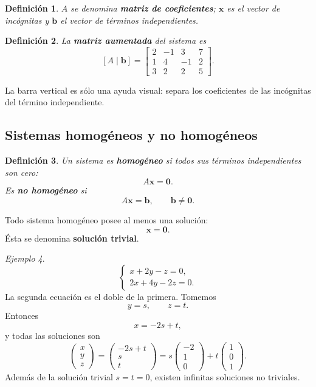 \documentclass[12pt]{article}
\newtheorem{definicion}{Definición}[section]
\theoremstyle{remark}
\newtheorem{ejemplo}[definicion]{Ejemplo}
\begin{document}
\begin{definicion}
$A$ se denomina \textbf{matriz de coeficientes}; $\mathbf{x}$ es el vector de incógnitas y
$\mathbf{b}$ el vector de términos independientes.
\end{definicion}

\begin{definicion}
La \textbf{matriz aumentada} del sistema es
\[
[A\mid\mathbf b]=
\left[
\begin{array}{ccc|c}
2&-1&3&7\\
1&4&-1&2\\
3&2&2&5
\end{array}
\right].
\]
\end{definicion}

La barra vertical es sólo una ayuda visual: separa los coeficientes de las incógnitas del término
independiente.
\subsection*{Sistemas homogéneos y no homogéneos}
\begin{definicion}
Un sistema es \textbf{homogéneo} si todos sus términos independientes son cero:
\[
A\mathbf{x}=\mathbf{0}.
\]
Es \textbf{no homogéneo} si
\[
A\mathbf{x}=\mathbf{b},\qquad \mathbf b\neq\mathbf0.
\]
\end{definicion}

Todo sistema homogéneo posee al menos una solución:
\[
\mathbf{x}=\mathbf0.
\]
Ésta se denomina \textbf{solución trivial}.

\begin{ejemplo}
\[
\begin{cases}
x+2y-z=0,\\
2x+4y-2z=0.
\end{cases}
\]
La segunda ecuación es el doble de la primera. Tomemos
\[
y=s,\qquad z=t.
\]
Entonces
\[
x=-2s+t,
\]
y todas las soluciones son
\[
\begin{pmatrix}x\\y\\z\end{pmatrix}
=
\begin{pmatrix}-2s+t\\s\\t\end{pmatrix}
=
s\begin{pmatrix}-2\\1\\0\end{pmatrix}
+t\begin{pmatrix}1\\0\\1\end{pmatrix}.
\]
Además de la solución trivial $s=t=0$, existen infinitas soluciones no triviales.
\end{ejemplo}
\end{document}
